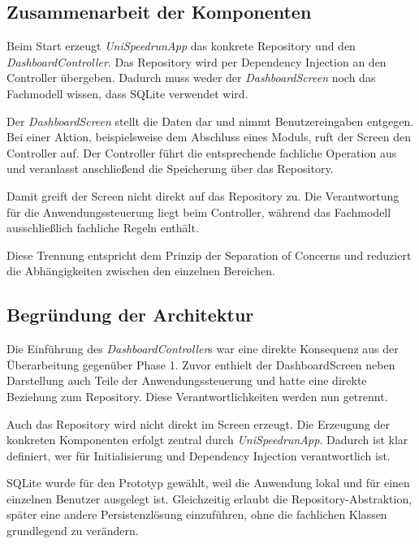 \documentclass[11pt,a4paper]{article}
\begin{document}
\subsection{Zusammenarbeit der Komponenten}

Beim Start erzeugt \textit{UniSpeedrunApp} das konkrete Repository und
den \textit{DashboardController}. Das Repository wird per Dependency
Injection an den Controller übergeben. Dadurch muss weder der
\textit{DashboardScreen} noch das Fachmodell wissen, dass SQLite
verwendet wird.

Der \textit{DashboardScreen} stellt die Daten dar und nimmt
Benutzereingaben entgegen. Bei einer Aktion, beispielsweise dem
Abschluss eines Moduls, ruft der Screen den Controller auf. Der
Controller führt die entsprechende fachliche Operation aus und
veranlasst anschließend die Speicherung über das Repository.

Damit greift der Screen nicht direkt auf das Repository zu. Die
Verantwortung für die Anwendungssteuerung liegt beim Controller,
während das Fachmodell ausschließlich fachliche Regeln enthält.

Diese Trennung entspricht dem Prinzip der Separation of Concerns und
reduziert die Abhängigkeiten zwischen den einzelnen Bereichen.

\subsection{Begründung der Architektur}

Die Einführung des \textit{DashboardController}s war eine direkte
Konsequenz aus der Überarbeitung gegenüber Phase 1. Zuvor enthielt
der DashboardScreen neben Darstellung auch Teile der
Anwendungssteuerung und hatte eine direkte Beziehung zum Repository.
Diese Verantwortlichkeiten werden nun getrennt.

Auch das Repository wird nicht direkt im Screen erzeugt. Die
Erzeugung der konkreten Komponenten erfolgt zentral durch
\textit{UniSpeedrunApp}. Dadurch ist klar definiert, wer für
Initialisierung und Dependency Injection verantwortlich ist.

SQLite wurde für den Prototyp gewählt, weil die Anwendung lokal und
für einen einzelnen Benutzer ausgelegt ist. Gleichzeitig erlaubt die
Repository-Abstraktion, später eine andere Persistenzlösung
einzuführen, ohne die fachlichen Klassen grundlegend zu verändern.
\end{document}
